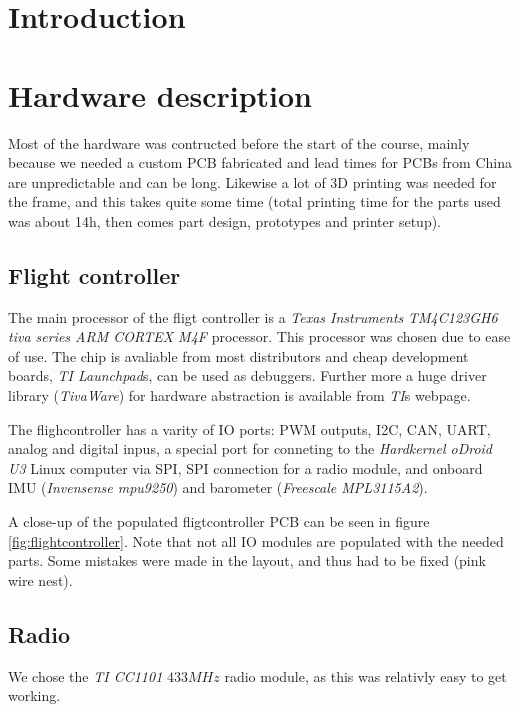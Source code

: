 


\newpage

\section{ Introduction }



\section{Hardware description}
Most of the hardware was contructed before the start of the course, mainly
because we needed a custom PCB fabricated and lead times for PCBs from China are
unpredictable and can be long.
Likewise a lot of 3D printing was needed for the frame, and this takes quite
some time (total printing time for the parts used was about 14h, then comes
part design, prototypes and printer setup).

\subsection{ Flight controller }
The main processor of the fligt controller is a \emph{Texas
Instruments} \emph{TM4C123GH6 tiva series ARM CORTEX M4F} processor.
This processor was chosen due to ease of use.
The chip is avaliable from most distributors and cheap development boards,
\emph{TI Launchpad}s, can be used as debuggers. Further more a huge driver
library (\emph{TivaWare}) for hardware abstraction is available from \emph{TI}s
webpage.

The flighcontroller has a varity of IO ports: PWM outputs, I2C, CAN, UART,
analog and digital inpus, a special port for conneting to the \emph{Hardkernel
oDroid U3} Linux computer via SPI, SPI connection for a radio module, and
onboard IMU (\emph{Invensense mpu9250}) and barometer (\emph{Freescale
MPL3115A2}).

A close-up of the populated fligtcontroller PCB can be seen in figure
\ref{fig:flightcontroller}. Note that not all IO modules are populated with the
needed parts. Some mistakes were made in the layout, and thus had to be fixed
(pink wire nest).

\subsection{ Radio }
We chose the \emph{TI CC1101} $433MHz$ radio module, as this was relativly easy
to get working.

